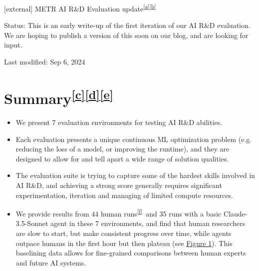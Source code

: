 \documentclass[
]{article}
\author{}
\date{}
\providecommand{\tightlist}{%
  \setlength{\itemsep}{0pt}\setlength{\parskip}{0pt}}
\begin{document}
{{[}external{]} }{METR AI R\&D Evaluation
update}\textsuperscript{\label{cmnt_ref1}\hyperref[cmnt1]{{[}a{]}}\label{cmnt_ref2}\hyperref[cmnt2]{{[}b{]}}}

{Status: }{This is an early write-up of the first iteration of our AI
R\&D evaluation. We are hoping to publish a version of this soon on our
blog, and are looking for input. }

{Last modified: }{Sep 6, 2024}

\section{\texorpdfstring{{Summary}\textsuperscript{\protect\hypertarget{cmnt_ref3}{}\hyperref[cmnt3]{{[}c{]}}\protect\hypertarget{cmnt_ref4}{}\hyperref[cmnt4]{{[}d{]}}\protect\hypertarget{cmnt_ref5}{}\hyperref[cmnt5]{{[}e{]}}}}{Summary{[}c{]}{[}d{]}{[}e{]}}}\label{h.4dxrroeyhuma}

\begin{itemize}
\tightlist
\item
  {We present 7 evaluation environments for testing AI R\&D abilities. }
\end{itemize}

\begin{itemize}
\tightlist
\item
  {Each evaluation presents a unique continuous ML optimization problem
  (e.g. reducing the loss of a model, or improving the runtime), and
  they are designed to allow for and tell apart a wide range of solution
  qualities.}
\end{itemize}

\begin{itemize}
\tightlist
\item
  {The evaluation suite is trying to capture some of the hardest skills
  involved in AI R\&D, and achieving a strong score generally requires
  significant experimentation, iteration and managing of limited compute
  resources. }
\item
  {We provide results from }{44 human
  runs}\textsuperscript{\label{cmnt_ref6}\hyperref[cmnt6]{{[}f{]}}}{~and
  35 runs with a basic Claude-3.5-Sonnet agent in these 7 environments,
  and find that human researchers are slow to start, but make consistent
  progress over time, while agents outpace humans in the first hour but
  then plateau (see }{\hyperref[id.mf3qlnxl0yyh]{Figure 1}}{). This
  baselining data allows for fine-grained comparisons between human
  experts and future AI systems. ~}
\end{itemize}
\end{document}
